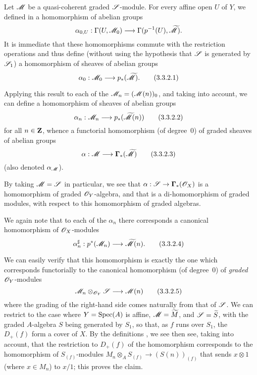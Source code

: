 \begin{env}[3.3.2]
\label{II.3.3.2}
Let $\mathscr{M}$ be a quasi-coherent graded $\mathscr{S}$-module.
For every affine open $U$ of $Y$, we defined in  a homomorphism of abelian groups
\[
  \alpha_{0,U} : \Gamma(U,\sh{M}_0) \to \Gamma(p^{-1}(U),\widetilde{\sh{M}}).
\]
It is immediate that these homomorphisms commute with the restriction operations  and thus define (without using the hypothesis that $\mathscr{S}$ is generated by $\mathscr{S}_1$) a homomorphism of sheaves of abelian groups
\[
\label{II.3.3.2.1}
  \alpha_0 : \sh{M}_0 \to p_*(\widetilde{\sh{M}}).
\tag{3.3.2.1}
\]

Applying this result to each of the $\mathscr{M}_n=(\mathscr{M}(n))_0$, and taking  into account, we can define a homomorphism of sheaves of abelian groups
\[
\label{II.3.3.2.2}
  \alpha_n : \sh{M}_n \to p_*(\widetilde{\sh{M}}(n))
\tag{3.3.2.2}
\]
for all $n\in\mathbf{Z}$, whence a functorial homomorphism (of degree~$0$) of graded sheaves of abelian groups
\[
\label{II.3.3.2.3}
  \alpha : \sh{M} \to \bbGamma_*(\widetilde{\sh{M}})
\tag{3.3.2.3}
\]
(also denoted $\alpha_{\mathscr{M}}$).

By taking $\mathscr{M}=\mathscr{S}$ in particular, we see that $\alpha:\sh{S}\to\bbGamma_*(\sh{O}_X)$ is a homomorphism of graded $\mathscr{O}_Y$-algebra, and that  is a di-homomorphism of graded modules, with respect to this homomorphism of graded algebras.

We again note that to each of the $\alpha_n$ there corresponds  a canonical homomorphism of $\mathscr{O}_X$-modules
\[
\label{II.3.3.2.4}
  \alpha_n^\sharp : p^*(\sh{M}_n) \to \widetilde{\sh{M}}(n).
\tag{3.3.2.4}
\]

We can easily verify that this homomorphism is exactly the one which corresponds functorially  to the canonical homomorphism (of degree~$0$) of \emph{graded} $\mathscr{O}_Y$-modules
\[
\label{II.3.3.2.5}
  \sh{M}_n\otimes_{\sh{O}_Y}\sh{S} \to \sh{M}(n)
\tag{3.3.2.5}
\]
where the grading of the right-hand side comes naturally from that of $\mathscr{S}$.
We can restrict to the case where $Y=\operatorname{Spec}(A)$ is affine, $\mathscr{M}=\widetilde{M}$, and $\mathscr{S}=\widetilde{S}$, with the graded $A$-algebra $S$ being generated by $S_1$, so that, as $f$ runs over $S_1$, the $D_+(f)$ form a cover of $X$.
By the definitions , we see then see, taking  into account, that the restriction to $D_+(f)$ of the homomorphism  corresponds  to the homomorphism of $S_{(f)}$-modules $M_n\otimes_A S_{(f)}\to(S(n))_{(f)}$ that sends $x\otimes1$ (where $x\in M_n$) to $x/1$;
this proves the claim.
\end{env}

